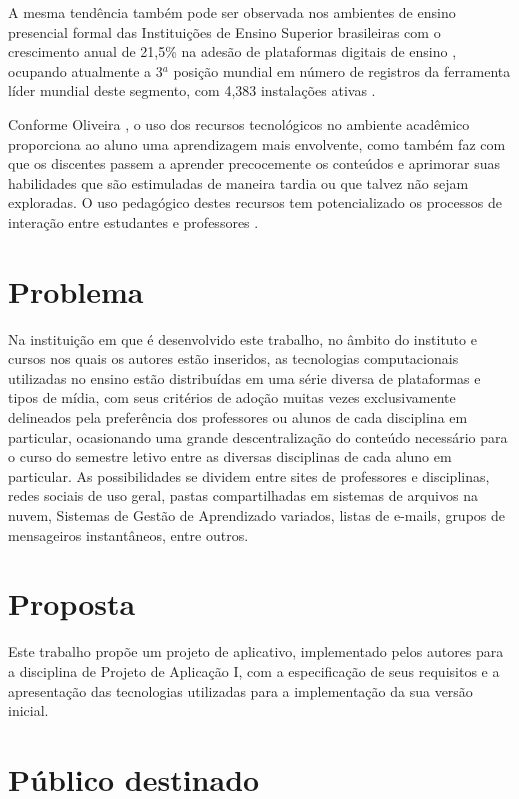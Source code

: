 A mesma tendência também pode ser observada nos ambientes de ensino presencial formal das Instituições de Ensino Superior brasileiras \cite{book:campus-comp-br} com o crescimento anual de 21,5\% na adesão de  plataformas digitais de ensino \cite{website:elearning_market}, ocupando atualmente a 3$^{a}$ posição mundial em número de registros da ferramenta líder mundial deste segmento, com 4,383 instalações ativas \cite{website:moodle-stats} .

Conforme Oliveira \cite{book:oliveira}, o uso dos recursos tecnológicos no ambiente acadêmico proporciona ao aluno uma aprendizagem mais envolvente, como também faz com que os discentes passem a aprender precocemente os conteúdos e aprimorar suas habilidades que são estimuladas de maneira tardia ou que talvez não sejam exploradas.
O uso pedagógico destes recursos tem potencializado os processos de interação entre estudantes e professores \cite{book:zanette}. 

\section{Problema}

Na instituição em que é desenvolvido este trabalho, no âmbito do instituto e cursos nos quais os autores estão inseridos, as tecnologias computacionais utilizadas no ensino estão distribuídas em uma série diversa de plataformas e tipos de mídia, com seus critérios de adoção muitas vezes exclusivamente delineados pela preferência dos professores ou alunos de cada disciplina em particular, ocasionando uma grande descentralização do conteúdo necessário para o curso do semestre letivo entre as diversas disciplinas de cada aluno em particular. 
As possibilidades se dividem entre sites de professores e disciplinas, redes sociais de uso geral, pastas compartilhadas em sistemas de arquivos na nuvem, Sistemas de Gestão de Aprendizado variados, listas de e-mails, grupos de mensageiros instantâneos, entre outros.

\section{Proposta}

Este trabalho propõe um projeto de aplicativo, implementado pelos autores para a disciplina de Projeto de Aplicação I, com a especificação de seus requisitos  e a apresentação das tecnologias utilizadas para a implementação da sua versão inicial.

\section{Público destinado}


